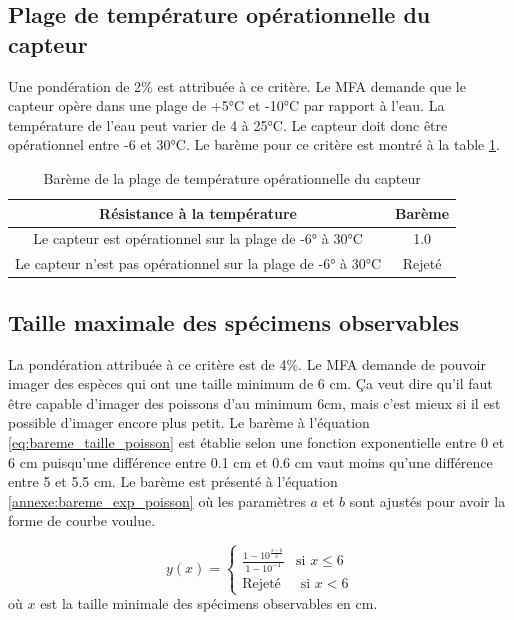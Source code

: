 \subsection{Plage de température opérationnelle du capteur}

Une pondération de 2\% est attribuée à ce critère. Le MFA demande que le capteur opère dans une plage de +5°C et -10°C par rapport à l'eau. La température de l'eau peut varier de 4 à 25°C. Le capteur doit donc être opérationnel entre -6 et 30°C. Le barème pour ce critère est montré à la table \ref{t:bareme_resistance_temperature}.

\begin{table}[htp]
   \footnotesize
   \centering
   \begin{tabular}{|c|c|}
        \hline
        Résistance à la température & Barème\\
        \hline
        \hline
        Le capteur est opérationnel sur la plage de -6° à 30°C & 1.0 \\
        \hline
        Le capteur n'est pas opérationnel sur la plage de -6° à 30°C & Rejeté \\
        \hline
   \end{tabular}
   \caption{Barème de la plage de température opérationnelle du capteur}
   \label{t:bareme_resistance_temperature}
\end{table}


\subsection{Taille maximale des spécimens observables}

La pondération attribuée à ce critère est de 4\%. Le MFA demande de pouvoir imager des espèces qui ont une taille minimum de 6 cm. Ça veut dire qu'il faut être capable d'imager des poissons d'au minimum 6cm, mais c'est mieux si il est possible d'imager encore plus petit. Le barème à l'équation \ref{eq:bareme_taille_poisson} est établie selon une fonction exponentielle entre 0 et 6 cm puisqu'une différence entre 0.1 cm et 0.6 cm vaut moins qu'une différence entre 5 et 5.5 cm. Le barème est présenté à l'équation \ref{annexe:bareme_exp_poisson} où les paramètres $a$ et $b$ sont ajustés pour avoir la forme de courbe voulue.

\begin{equation}
y(x) = \begin{cases}
        \frac{1-10^{\frac{x-6}{6}}}{1-10^{-1}} & \text{si } x \leq 6\\
        \text{Rejeté} & \text{ si } x < 6
    \end{cases}
    \label{eq:bareme_taille_poisson}
\end{equation}
où $x$ est la taille minimale des spécimens observables en cm.

